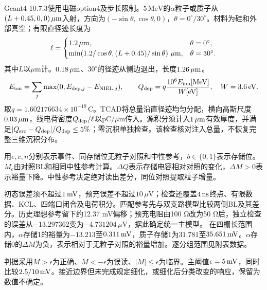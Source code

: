 \documentclass[UTF8,a4paper,zihao=-4,fontset=fandol]{ctexart}
\begin{document}
Geant4 10.7.3使用电磁option4及步长限制\cite{g4em}。$5\,\mathrm{MeV}$的$\alpha$粒子或质子从$(L+0.45,0,0)\,\mu\mathrm{m}$入射，方向为$(-\sin\theta,\cos\theta,0)$，$\theta=0^\circ/30^\circ$。材料为硅和外部真空；有限直径迹长度为
\begin{equation}\ell=\begin{cases}1.2\,\mu\mathrm{m},&\theta=0^\circ,\\\min\!\left(1.2/\cos\theta,(L+0.45)/\sin\theta\right)\,\mu\mathrm{m},&\theta=30^\circ.\end{cases}\end{equation}
其中$L$以$\mu\mathrm m$计。$0.18\,\mu\mathrm{m}$、$30^\circ$的径迹从侧边退出，长度$1.26\,\mu\mathrm{m}$。
\begin{equation}E_{\rm ion}=\sum_j\max(0,E_{{\rm dep},j}-E_{{\rm NIEL},j}),\qquad Q_{\rm dep}=q\frac{10^6E_{\rm ion}[\mathrm{MeV}]}{W[\mathrm{eV}]},\quad W=3.6\,\mathrm{eV}.\end{equation}
取$q=1.602176634\times10^{-19}\,\mathrm C$。TCAD将总量沿直径迹均匀分配，横向高斯尺度$0.03\,\mu\mathrm{m}$，线电荷密度$Q_{\rm dep}/\ell$以$\mathrm{pC}/\mu\mathrm m$传入。源积分须计入$1\,\mu\mathrm{m}$有效厚度，并满足$|Q_{\rm src}-Q_{\rm dep}|/Q_{\rm dep}\leq5\%$；零沉积单独检查。该检查核对注入总量，不恢复完整三维沉积分布。
\begin{table}[H]\centering\small\caption{保持与读出时序。}\timingtable\end{table}

用$e,c,n$分别表示事件、同存储位无粒子对照和中性参考，$b\in\{0,1\}$表示存储位。
\metricdefs
$M_c$由对照BL和相同中性参考计算。$\Delta Q$表示存储电容相对对照的变化，$\Delta M>0$表示裕量下降。中性参考决定绝对读出差分，同位对照提取粒子增量。

初态误差须不超过$1\,\mathrm{mV}$，预充误差不超过$10\,\mu\mathrm V$；检查还覆盖$4\,\mathrm{ns}$终点、有限数据、KCL、四端口闭合及电荷积分。匹配参考先与双支路模型比较两侧BL及其差分。历史理想参考留下约12.37 mV偏移；预充电阻由100 Ω改为50 Ω后，独立检查的误差从$-13.297362$变为$-4.731204\,\mu\mathrm V$，据此确定统一主模型。
在四栅长范围内，$\alpha$存储1的裕量为$-13.213$至$0.311\,\mathrm{mV}$，质子存储1为$31.781$至$35.651\,\mathrm{mV}$。$\alpha$存储0的$\Delta M$为负，表示相对于无粒子对照的裕量增加。逐分组范围见附表数据。

判据采用$M>\epsilon$为正确、$M<-\epsilon$为误读、$|M|\leq\epsilon$为临界。主阈值$\epsilon=5\,\mathrm{mV}$，同时比较$2.5/10\,\mathrm{mV}$。接近边界但未完成规定细化，或细化后分类改变的响应，保留为数值不确定。
\end{document}
